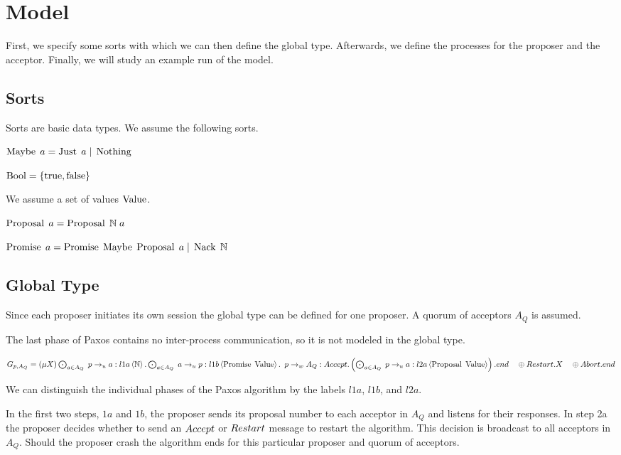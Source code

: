 \chapter{Model}
First, we specify some sorts with which we can then define the global type.
Afterwards, we define the processes for the proposer and the acceptor.
Finally, we will study an example run of the model.

\section{Sorts}
Sorts are basic data types.
We assume the following sorts.

$\operatorname{Maybe}\; a = \operatorname{Just}\; a \; | \; \operatorname{Nothing}$

$\operatorname{Bool} = \left\{\operatorname{true}, \operatorname{false}\right\}$

We assume a set of values $\operatorname{Value}$.

$\operatorname{Proposal}\; a = \operatorname{Proposal}\; \mathbb{N}\; a$

$\operatorname{Promise}\; a = \operatorname{Promise}\; \operatorname{Maybe}\; \operatorname{Proposal}\; a \; | \; \operatorname{Nack}\; \mathbb{N}$

\section{Global Type}
Since each proposer initiates its own session the global type can be defined for one proposer.
A quorum of acceptors $A_Q$ is assumed.

The last phase of Paxos contains no inter-process communication, so it is not modeled in the global type.

$G_{p, A_Q} = \left(\mu X\right) \bigodot_{a \in A_Q}\; p \to_u a : l1a \left\langle \mathbb{N} \right\rangle . \bigodot_{a \in A_Q}\; a \to_u p : l1b \left\langle \operatorname{Promise}\; \operatorname{Value} \right\rangle .\\
\hspace*{0.5em}p \to_w A_Q : \mathnormal{Accept}.\left(\bigodot_{a \in A_Q}\; p \to_u a : l2a \left\langle \operatorname{Proposal}\; \operatorname{Value} \right\rangle\right).end\\
\hspace*{1em}\oplus \mathnormal{Restart}.X\\
\hspace*{1em}\oplus \mathnormal{Abort}.end$

We can distinguish the individual phases of the Paxos algorithm by the labels $l1a$, $l1b$, and $l2a$.

In the first two steps, $1a$ and $1b$, the proposer sends its proposal number to each acceptor in $A_Q$ and listens for their responses.
In step 2a the proposer decides whether to send an $\mathnormal{Accept}$ or $\mathnormal{Restart}$ message to restart the algorithm.
This decision is broadcast to all acceptors in $A_Q$.
Should the proposer crash the algorithm ends for this particular proposer and quorum of acceptors.

